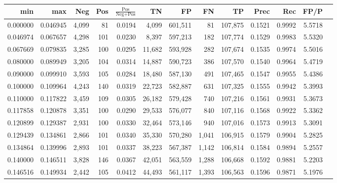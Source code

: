 \begin{tabular}{rrrrrrrrrrrrr}
\toprule
     min &      max &   Neg & Pos & $\frac{\text{Pos}}{\text{Neg}+\text{Pos}}$ &      TN &      FP &      FN &      TP &   Prec &    Rec &   FP/P \\
\midrule
0.000000 & 0.046945 & 4,099 &  81 &                                     0.0194 &   4,099 & 601,511 &      81 & 107,875 & 0.1521 & 0.9992 & 5.5718 \\
0.046974 & 0.067657 & 4,298 & 101 &                                     0.0230 &   8,397 & 597,213 &     182 & 107,774 & 0.1529 & 0.9983 & 5.5320 \\
0.067669 & 0.079835 & 3,285 & 100 &                                     0.0295 &  11,682 & 593,928 &     282 & 107,674 & 0.1535 & 0.9974 & 5.5016 \\
0.080000 & 0.089949 & 3,205 & 104 &                                     0.0314 &  14,887 & 590,723 &     386 & 107,570 & 0.1540 & 0.9964 & 5.4719 \\
0.090000 & 0.099910 & 3,593 & 105 &                                     0.0284 &  18,480 & 587,130 &     491 & 107,465 & 0.1547 & 0.9955 & 5.4386 \\
0.100000 & 0.109964 & 4,243 & 140 &                                     0.0319 &  22,723 & 582,887 &     631 & 107,325 & 0.1555 & 0.9942 & 5.3993 \\
0.110000 & 0.117822 & 3,459 & 109 &                                     0.0305 &  26,182 & 579,428 &     740 & 107,216 & 0.1561 & 0.9931 & 5.3673 \\
0.117858 & 0.120878 & 3,351 & 100 &                                     0.0290 &  29,533 & 576,077 &     840 & 107,116 & 0.1568 & 0.9922 & 5.3362 \\
0.120899 & 0.129387 & 2,931 & 100 &                                     0.0330 &  32,464 & 573,146 &     940 & 107,016 & 0.1573 & 0.9913 & 5.3091 \\
0.129439 & 0.134861 & 2,866 & 101 &                                     0.0340 &  35,330 & 570,280 &   1,041 & 106,915 & 0.1579 & 0.9904 & 5.2825 \\
0.134864 & 0.139996 & 2,893 & 101 &                                     0.0337 &  38,223 & 567,387 &   1,142 & 106,814 & 0.1584 & 0.9894 & 5.2557 \\
0.140000 & 0.146511 & 3,828 & 146 &                                     0.0367 &  42,051 & 563,559 &   1,288 & 106,668 & 0.1592 & 0.9881 & 5.2203 \\
0.146516 & 0.149934 & 2,442 & 105 &                                     0.0412 &  44,493 & 561,117 &   1,393 & 106,563 & 0.1596 & 0.9871 & 5.1976 \\

\end{tabular}

